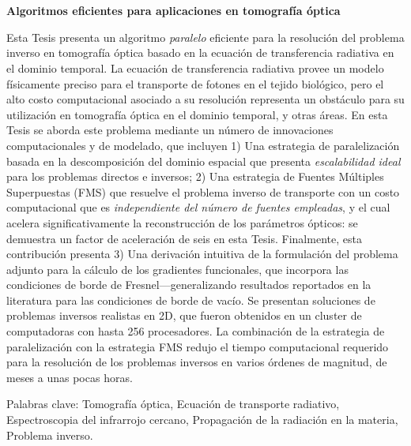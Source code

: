 \pagestyle{empty}
\chapter*{}

\begin{center}
\begin{large}
\textbf{Algoritmos eficientes para aplicaciones en tomografía óptica}
\end{large}
\end{center}

\vspace{1cm}
Esta Tesis presenta un algoritmo {\em paralelo} eficiente  
para la resolución del problema inverso en 
tomografía óptica basado en la ecuación de transferencia radiativa en el dominio temporal. 
La ecuación de transferencia radiativa provee un modelo 
físicamente preciso para el transporte de fotones 
en el tejido biológico, pero el alto costo computacional 
asociado a su resolución representa un obstáculo 
para su utilización en tomografía óptica en el dominio 
temporal, y otras áreas. En esta Tesis se aborda este problema 
mediante un número de innovaciones computacionales y de 
modelado, que incluyen 1) Una estrategia de paralelización 
basada en la descomposición del dominio espacial que presenta 
\textit{escalabilidad ideal} para los problemas directos 
e inversos; 2) Una estrategia de Fuentes Múltiples Superpuestas 
(FMS) que resuelve el problema inverso de transporte 
con un costo computacional que es {\em independiente del 
número de fuentes empleadas}, y el cual acelera significativamente la reconstrucción de los parámetros ópticos: 
se demuestra un factor de aceleración de seis en esta Tesis. 
Finalmente, esta contribución presenta 3) Una derivación 
intuitiva de la formulación del problema adjunto para la 
cálculo de los gradientes funcionales, que incorpora 
las condiciones de borde de Fresnel---generalizando 
resultados reportados en la literatura para las condiciones 
de borde de vacío. Se presentan 
soluciones de problemas inversos realistas en 2D, 
que fueron obtenidos en un cluster de computadoras con 
hasta 256 procesadores. La combinación de la estrategia 
de paralelización con la estrategia FMS redujo el tiempo 
computacional requerido para la resolución de los problemas inversos en varios órdenes de magnitud, de meses a unas pocas horas. 

\vspace{1cm}
\noindent
Palabras clave: 
Tomografía óptica,
Ecuación de transporte radiativo, 
Espectroscopia del infrarrojo cercano, 
Propagación de la radiación en la materia,
Problema inverso.
\pagestyle{empty}
